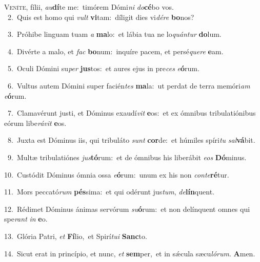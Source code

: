 \lettrine{\initial\textcolor{\initialcolor}{V}}{eníte,} fílii, \textit{au}\-\textbf{dí}te me:~\star timórem Dómi\textit{ni} \textit{do}\-\textbf{cé}bo vos.\\
{\numbfont\textcolor{\numbcolor}{~2.}}~Quis est homo qui \textit{vult} \textbf{vi}\-tam:~\star díligit dies vi\-\textit{dé}\-\textit{re} \textbf{bo}\-nos?\par
{\numbfont\textcolor{\numbcolor}{~3.}}~Próhibe linguam tuam \textit{a} \textbf{ma}\-lo:~\star et lábia tua ne lo\-\textit{quán}\-\textit{tur} \textbf{do}\-lum.\par
{\numbfont\textcolor{\numbcolor}{~4.}}~Divérte a malo, et \textit{fac} \textbf{bo}\-num:~\star inquíre pacem, et persé\-\textit{que}\-\textit{re} \textbf{e}\-am.\par
{\numbfont\textcolor{\numbcolor}{~5.}}~Oculi Dómini su\textit{per} \textbf{jus}\-tos:~\star et aures ejus in pre\textit{ces} \textit{e}\-\textbf{ó}rum.\par
{\numbfont\textcolor{\numbcolor}{~6.}}~Vultus autem Dómini super facién\textit{tes} \textbf{ma}\-la:~\star ut perdat de terra memóri\textit{am} \textit{e}\-\textbf{ó}rum.\par
{\numbfont\textcolor{\numbcolor}{~7.}}~Clamavérunt justi, et Dóminus exaudí\textit{vit} \textbf{e}\-os:~\star et ex ómnibus tribulatiónibus eórum libe\-\textit{rá}\-\textit{vit} \textbf{e}\-os.\par
{\numbfont\textcolor{\numbcolor}{~8.}}~Juxta est Dóminus iis, qui tribuláto \textit{sunt} \textbf{cor}\-de:~\star et húmiles spíri\textit{tu} \textit{sal}\-\textbf{vá}bit.\par
{\numbfont\textcolor{\numbcolor}{~9.}}~Multæ tribulatiónes \textit{jus}\-\textbf{tó}rum:~\star et de ómnibus his liberábit \textit{e}\-\textit{os} \textbf{Dó}\-minus.\par
{\numbfont\textcolor{\numbcolor}{10.}}~Custódit Dóminus ómnia ossa \textit{e}\-\textbf{ó}rum:~\star unum ex his non \textit{con}\-\textit{te}\textbf{ré}tur.\par
{\numbfont\textcolor{\numbcolor}{11.}}~Mors peccató\textit{rum} \textbf{pés}\-sima:~\star et qui odérunt jus\-\textit{tum}\-, \textit{de}\-\textbf{lín}quent.\par
{\numbfont\textcolor{\numbcolor}{12.}}~Rédimet Dóminus ánimas servórum \textit{su}\-\textbf{ó}rum:~\star et non delínquent omnes qui spe\textit{rant} \textit{in} \textbf{e}\-o.\par
{\numbfont\textcolor{\numbcolor}{13.}}~Glória Patri, \textit{et} \textbf{Fí}\-lio,~\star et Spirí\-\textit{tu}\-\textit{i} \textbf{Sanc}\-to.\par
{\numbfont\textcolor{\numbcolor}{14.}}~Sicut erat in princípio, et nunc, \textit{et} \textbf{sem}\-per,~\star et in sǽcula sæcu\-\textit{ló}\-\textit{rum}. \textbf{A}\-men.\par
